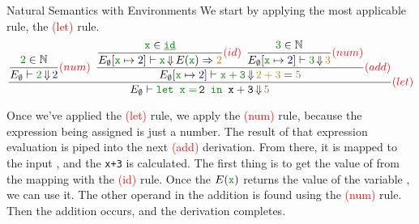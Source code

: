 \begin{example}[Lecture 3]{Natural Semantics with Environments}
  We start by applying the most applicable rule, the \textcolor{red}{(let)} rule.
  \begin{equation*}
    \dfrac{
      \dfrac{\SemanticInput{2} \in \NaturalNumbers}{E_{\emptyset} \vdash \SemanticInput{2} \EvaluatesTo \textcolor{Blue4}{2}} \textcolor{red}{(num)} \:\:
      \dfrac{
        \dfrac{\SemanticInput{\mathtt{x}} \in \SemanticInput{\mathtt{\underline{id}}}}
        {E_{\emptyset} [\SemanticInput{\mathtt{x}} \mapsto \textcolor{Blue4}{2}] \vdash \SemanticInput{\mathtt{x}} \EvaluatesTo E(\SemanticInput{\mathtt{x}}) \Rightarrow \textcolor{Orange3}{2}} \textcolor{red}{(id)} \:\:
        \dfrac{\SemanticInput{3} \in \NaturalNumbers}
        {E_{\emptyset} [\SemanticInput{\mathtt{x}} \mapsto \textcolor{Blue4}{2}] \vdash \SemanticInput{3} \EvaluatesTo \textcolor{Orange3}{3}} \textcolor{red}{(num)}}
      {E_{\emptyset}[\SemanticInput{\mathtt{x}} \mapsto \textcolor{Blue4}{2}] \vdash \SemanticInput{\mathtt{x+3}} \EvaluatesTo \textcolor{Orange3}{2+3} = \textcolor{Burlywood4}{5}} \textcolor{red}{(add)}}
    {E_{\emptyset} \vdash \SemanticInput{\text{\texttt{let }}} \mathtt{\SemanticInput{x=}\,2} \SemanticInput{\text{\texttt{ in }}} \mathtt{x+3} \EvaluatesTo \textcolor{Burlywood4}{5}} \textcolor{red}{(let)}
  \end{equation*}

  Once we've applied the \textcolor{red}{(let)} rule, we apply the \textcolor{red}{(num)} rule, because the expression being assigned is just a number.
  The result of that expression evaluation is piped into the next \textcolor{red}{(add)} derivation.
  From there, it is mapped to the input , and the \texttt{x+3} is calculated.
  The first thing is to get the value of  from the mapping with the \textcolor{red}{(id)} rule.
  Once the $E(\SemanticInput{\mathtt{x}})$ returns the value of the variable , we can use it.
  The other operand in the addition is found using the \textcolor{red}{(num)} rule.
  Then the addition occurs, and the derivation completes.
\end{example}
  
